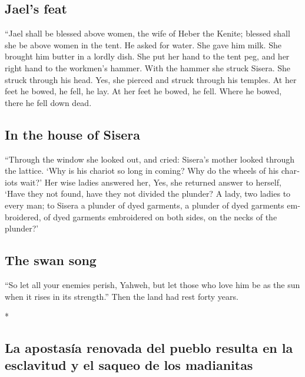 \begin{paracol}{2}
\begin{otherlanguage}{english}
\hypertarget{jaels-feat}{%
\subsection{Jael's feat}\label{jaels-feat}}

 ``Jael shall be blessed above women, the wife of Heber
the Kenite; blessed shall she be above women in the tent.
 He asked for water. She gave him milk. She brought him
butter in a lordly dish.  She put her hand to the tent
peg, and her right hand to the workmen's hammer. With the hammer she
struck Sisera. She struck through his head. Yes, she pierced and struck
through his temples.  At her feet he bowed, he fell, he
lay. At her feet he bowed, he fell. Where he bowed, there he fell down
dead.

\hypertarget{in-the-house-of-sisera}{%
\subsection{In the house of Sisera}\label{in-the-house-of-sisera}}

 ``Through the window she looked out, and cried: Sisera's
mother looked through the lattice. `Why is his chariot so long in
coming? Why do the wheels of his chariots wait?'  Her
wise ladies answered her, Yes, she returned answer to herself,
 `Have they not found, have they not divided the plunder?
A lady, two ladies to every man; to Sisera a plunder of dyed garments, a
plunder of dyed garments embroidered, of dyed garments embroidered on
both sides, on the necks of the plunder?'

\hypertarget{the-swan-song}{%
\subsection{The swan song}\label{the-swan-song}}

 ``So let all your enemies perish, Yahweh, but let those
who love him be as the sun when it rises in its strength.'' Then the
land had rest forty years.

\end{otherlanguage}

\switchcolumn[0]*

\hypertarget{la-apostasuxeda-renovada-del-pueblo-resulta-en-la-esclavitud-y-el-saqueo-de-los-madianitas}{%
\subsection{La apostasía renovada del pueblo resulta en la esclavitud y
el saqueo de los
madianitas}\label{la-apostasuxeda-renovada-del-pueblo-resulta-en-la-esclavitud-y-el-saqueo-de-los-madianitas}}


\end{paracol}
